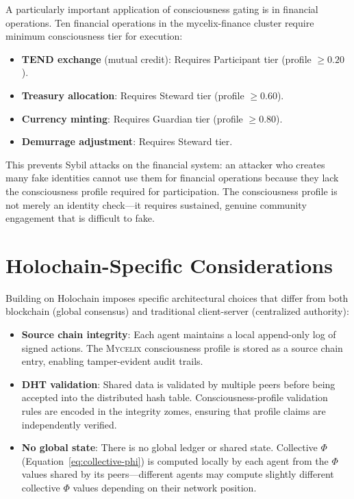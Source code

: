 \documentclass[12pt]{book}
\newcommand{\mycelix}{\textsc{Mycelix}}
\begin{document}
A particularly important application of consciousness gating is in financial operations. Ten financial operations in the mycelix-finance cluster require minimum consciousness tier for execution:

\begin{itemize}
  \item \textbf{TEND exchange} (mutual credit): Requires Participant tier (profile $\geq 0.20$).
  \item \textbf{Treasury allocation}: Requires Steward tier (profile $\geq 0.60$).
  \item \textbf{Currency minting}: Requires Guardian tier (profile $\geq 0.80$).
  \item \textbf{Demurrage adjustment}: Requires Steward tier.
\end{itemize}

This prevents Sybil attacks on the financial system: an attacker who creates many fake identities cannot use them for financial operations because they lack the consciousness profile required for participation. The consciousness profile is not merely an identity check---it requires sustained, genuine community engagement that is difficult to fake.

\section{Holochain-Specific Considerations}

Building on Holochain imposes specific architectural choices that differ from both blockchain (global consensus) and traditional client-server (centralized authority):

\begin{itemize}
  \item \textbf{Source chain integrity}: Each agent maintains a local append-only log of signed actions. The \mycelix{} consciousness profile is stored as a source chain entry, enabling tamper-evident audit trails.
  \item \textbf{DHT validation}: Shared data is validated by multiple peers before being accepted into the distributed hash table. Consciousness-profile validation rules are encoded in the integrity zomes, ensuring that profile claims are independently verified.
  \item \textbf{No global state}: There is no global ledger or shared state. Collective $\Phi$ (Equation~\ref{eq:collective-phi}) is computed locally by each agent from the $\Phi$ values shared by its peers---different agents may compute slightly different collective $\Phi$ values depending on their network position.
\end{itemize}
\end{document}
